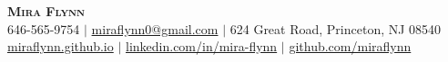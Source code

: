 \documentclass[letterpaper,10pt]{article}
\begin{document}


\begin{center}
    \textbf{\Huge \scshape Mira Flynn} \\ \vspace{1pt}
    \small 646-565-9754 $|$
    \href{mailto:miraflynn0@gmail.com}{miraflynn0@gmail.com} $|$
    624 Great Road, Princeton, NJ 08540 \\
    \href{https://miraflynn.github.io/}{miraflynn.github.io} $|$
    \href{https://www.linkedin.com/in/mira-flynn/}{linkedin.com/in/mira-flynn} $|$
    \href{https://github.com/miraflynn}{github.com/miraflynn}
\end{center}
\vspace{-12pt}


\end{document}
